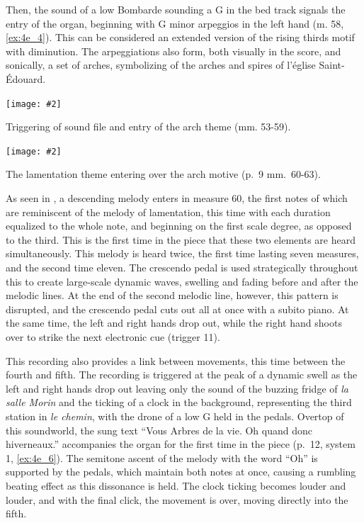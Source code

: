 \documentclass[12pt,twoside,maitrise]{dms_ks}
\newcommand{\customincludeexamples}[4][]{%
    \begin{example}[H]
        \centering
        \texttt{[image: \#2]}
        \caption{#4}
	\label{#3} 
    \end{example}
}
\theoremstyle{definition}
\begin{document}
{Then, the sound of a low Bombarde sounding a G in the bed track signals the entry of the organ, beginning with G minor arpeggios in the left hand (m. 58, \cref{ex:4e_4}). This can be considered an extended version of the rising thirds motif with diminution. 
The arpeggiations also form, both visually in the score, and sonically, a set of arches, symbolizing of the arches and spires of l'église Saint-Édouard.

\customincludeexamples[width=\textwidth]{4e_4}{ex:4e_4}{Triggering of sound file and entry of the arch theme (mm. 53-59).}

\customincludeexamples[width=\textwidth]{4e_5}{ex:4e_5}{The lamentation theme entering over the arch motive (p.~9 mm.~60-63).}

As seen in , a descending melody enters in measure 60, the first notes of which are reminiscent of the melody of lamentation, this time with each duration equalized to the whole note, and beginning on the first scale degree, as opposed to the third. 
This is the first time in the piece that these two elements are heard simultaneously. 
This melody is heard twice, the first time lasting seven measures, and the second time eleven. 
The crescendo pedal is used strategically throughout this to create large-scale dynamic waves, swelling and fading before and after the melodic lines. 
At the end of the second melodic line, however, this pattern is disrupted, and the crescendo pedal cuts out all at once with a subito piano. 
At the same time, the left and right hands drop out, while the right hand shoots over to strike the next electronic cue (trigger 11). 

This recording also provides a link between movements, this time between the fourth and fifth. 
The recording is triggered at the peak of a dynamic swell as the left and right hands drop out leaving only the sound of the buzzing fridge of \textit{la salle Morin} and the ticking of a clock in the background, representing the third station in \textit{le chemin}, with the drone of a low G held in the pedals. 
Overtop of this soundworld, the sung text “Vous Arbres de la vie. Oh quand donc hiverneaux.” accompanies the organ for the first time in the piece (p.~12, system 1, \cref{ex:4e_6}). 
The semitone ascent of the melody with the word “Oh” is supported by the pedals, which maintain both notes at once, causing a rumbling beating effect as this dissonance is held. 
The clock ticking becomes louder and louder, and with the final click, the movement is over, moving directly into the fifth.

}
\end{document}

